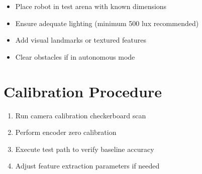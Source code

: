 \begin{itemize}
    \item Place robot in test arena with known dimensions
    \item Ensure adequate lighting (minimum 500 lux recommended)
    \item Add visual landmarks or textured features
    \item Clear obstacles if in autonomous mode
\end{itemize}

\section{Calibration Procedure}

\begin{enumerate}
    \item Run camera calibration checkerboard scan
    \item Perform encoder zero calibration
    \item Execute test path to verify baseline accuracy
    \item Adjust feature extraction parameters if needed
\end{enumerate}

